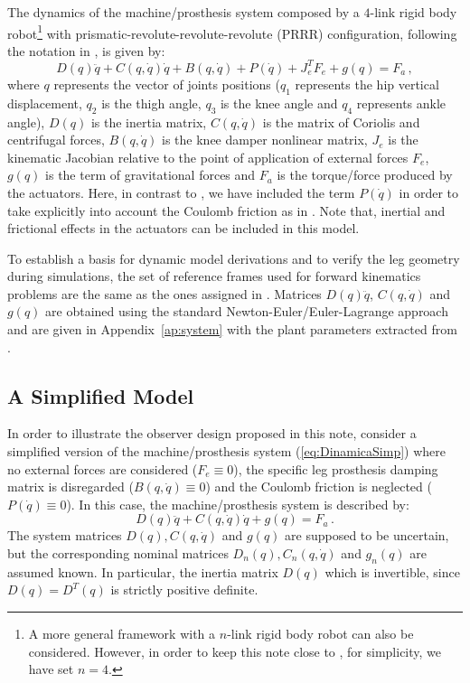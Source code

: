 \documentclass[letterpaper, 10 pt, journal, twocolumn]{IEEEtran}  %
\theoremstyle{plain}
\theoremstyle{definition}
\theoremstyle{remark}
\begin{document}
The dynamics of the machine/prosthesis system composed by a $4$-link rigid body robot\footnote{A more general framework with a $n$-link rigid body robot can also be considered. However, in order to keep this note close to \cite{Richter2015}, for simplicity, we have set $n=4$.}  with prismatic-revolute-revolute-revolute (PRRR) configuration, following the notation in \cite{Richter2015}, is given by:
%
\begin{equation}
D(q)\ddot{q} + C(q,\dot{q})\dot{q}+B(q,\dot{q}) + P(\dot{q}) + J_e^T F_e+g(q) = F_a\,,
\label{eq:Dinamica}
\end{equation}
%
where  $q$ represents the vector of joints positions ($q_1$ represents the hip vertical displacement, $q_2$ is the thigh angle, $q_3$ is the knee angle and $q_4$ represents ankle angle), $D(q)$ is the inertia matrix, $C(q,\dot{q})$ is the matrix of Coriolis and centrifugal forces, $B(q,\dot{q})$ is the knee  damper nonlinear matrix, $J_e$ is the kinematic Jacobian relative to the point of application of external forces $F_e$, $g(q)$ is the term of gravitational forces and $F_a$ is the torque/force produced by the actuators. Here, in contrast to \cite{Richter2015}, we have included the term  $P(\dot{q})$ in order to take explicitly into account the Coulomb friction as in \cite{LeeKhalil2015}. Note that, inertial and frictional effects in the actuators can be included in this model. 

To establish a basis for dynamic model derivations and to verify the leg geometry during simulations, the set of reference frames used for forward kinematics problems are the same as the ones assigned in \cite{Richter2015}. Matrices $D(q)\ddot{q}$, $C(q,\dot{q})$ and $g(q)$ are obtained using the standard Newton-Euler/Euler-Lagrange approach and are given in Appendix~\ref{ap:system} with the plant parameters  extracted from \cite{Richter2015}.

\subsection{A Simplified Model}


In order to illustrate the observer design proposed in this note, consider a simplified version of the machine/prosthesis system (\ref{eq:DinamicaSimp}) where no external forces are considered ($F_e \equiv 0$), the specific leg prosthesis damping matrix is disregarded ($B(q,\dot{q}) \equiv 0$) and the  Coulomb friction is neglected  ($P(\dot{q}) \equiv 0$). In this case, the machine/prosthesis system is described by:
%
\begin{equation}
D(q)\ddot{q} + C(q,\dot{q})\dot{q}+g(q) = F_a\,.
\label{eq:DinamicaSimp}
\end{equation}
%
The system matrices $D(q), C(q,\dot{q})$ and $g(q)$ are supposed to be uncertain, but the corresponding nominal matrices  $D_n(q), C_n(q,\dot{q})$ and $g_n(q)$ are assumed known. In particular, the inertia matrix $D(q)$ which is invertible, since $D(q)=D^T(q)$ is strictly positive definite.
\end{document}
